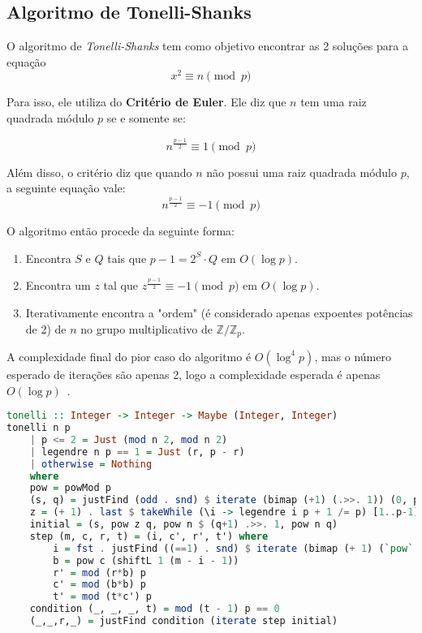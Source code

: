 \documentclass{article}
\begin{document}
\subsection{Algoritmo de Tonelli-Shanks}
\label{tonelliShanks}

O algoritmo de \textit{Tonelli-Shanks} tem como objetivo encontrar as 2 soluções para a equação
\begin{equation}
    x^2 \equiv n \pmod{p}
\end{equation}

Para isso, ele utiliza do \textbf{Critério de Euler}. Ele diz que $n$ tem uma raiz quadrada módulo $p$ se e somente se:

\begin{equation}
    n^{\frac{p-1}{2}} \equiv 1 \pmod{p}
\end{equation}

Além disso, o critério diz que quando $n$ não possui uma raiz quadrada módulo $p$, a seguinte equação vale:
\begin{equation}
    n^{\frac{p-1}{2}} \equiv -1 \pmod{p}
\end{equation}

O algoritmo então procede da seguinte forma:
\begin{enumerate}
    \item Encontra $S$ e $Q$ tais que $p-1 = 2^S \cdot Q$ em $O(\log p)$.
    \item Encontra um $z$ tal que $z^{\frac{p-1}{2}} \equiv -1 \pmod{p}$ em $O(\log p)$.
    \item Iterativamente encontra a "ordem" (é considerado apenas expoentes potências de 2) de $n$ no grupo multiplicativo de $\mathbb{Z} / \mathbb{Z}_p$.
\end{enumerate}

A complexidade final do pior caso do algoritmo é $O(\log^4 p)$, mas o número esperado de iterações são apenas 2, logo a complexidade esperada é apenas $O(\log p)$~\cite{Koo_Jo_Kwon_2013}.

\begin{minipage}{.9\linewidth}
\begin{lstlisting}[language=haskell,caption=Tonelli-Shanks]
tonelli :: Integer -> Integer -> Maybe (Integer, Integer)
tonelli n p
    | p <= 2 = Just (mod n 2, mod n 2)
    | legendre n p == 1 = Just (r, p - r)
    | otherwise = Nothing
    where
    pow = powMod p
    (s, q) = justFind (odd . snd) $ iterate (bimap (+1) (.>>. 1)) (0, p-1)
    z = (+ 1) . last $ takeWhile (\i -> legendre i p + 1 /= p) [1..p-1]
    initial = (s, pow z q, pow n $ (q+1) .>>. 1, pow n q)
    step (m, c, r, t) = (i, c', r', t') where
        i = fst . justFind ((==1) . snd) $ iterate (bimap (+ 1) (`pow` 2)) (0, t)
        b = pow c (shiftL 1 (m - i - 1))
        r' = mod (r*b) p
        c' = mod (b*b) p
        t' = mod (t*c') p
    condition (_, _, _, t) = mod (t - 1) p == 0
    (_,_,r,_) = justFind condition (iterate step initial)

\end{lstlisting}
\end{minipage}
\end{document}
